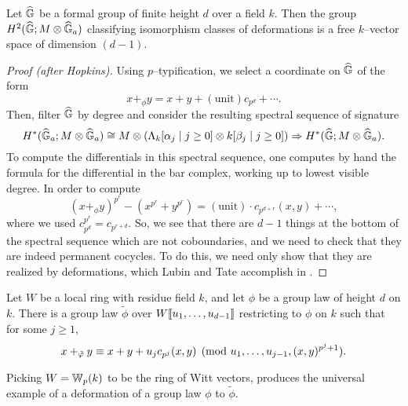 \begin{lemma}\label{CalculationOfLTTangentSpace}
Let $\widehat{\mathbb G}$ be a formal group of finite height $d$ over a field $k$.  Then the group $H^2(\widehat{\mathbb G}; M \otimes \widehat{\mathbb G}_a)$ classifying isomorphism classes of deformations is a free $k$--vector space of dimension $(d - 1)$.
\end{lemma}
\begin{proof}[Proof (after Hopkins)]
Using $p$--typification, we select a coordinate on $\widehat{\mathbb G}$ of the form \[x +_\phi y = x + y + (\mathrm{unit}) c_{p^d} + \cdots.\]  Then, filter $\widehat{\mathbb G}$ by degree and consider the resulting spectral sequence of signature \[H^*(\widehat{\mathbb G}_a; M \otimes \widehat{\mathbb G}_a) \cong M \otimes (\Lambda_k[\alpha_j \mid j \ge 0] \otimes k[\beta_j \mid j \ge 0]) \Rightarrow H^*(\widehat{\mathbb G}; M \otimes \widehat{\mathbb G}_a).\]  To compute the differentials in this spectral sequence, one computes by hand the formula for the differential in the bar complex, working up to lowest visible degree.  In order to compute  \[(x +_\phi y)^{p^r} - (x^{p^r} + y^{p^r}) = (\text{unit}) \cdot c_{p^{d + r}}(x, y) + \cdots,\] where we used $c_{p^d}^{p^r} = c_{p^{r+d}}$.   So, we see that there are $d - 1$ things at the bottom of the spectral sequence which are not coboundaries, and we need to check that they are indeed permanent cocycles.  To do this, we need only show that they are realized by deformations, which Lubin and Tate accomplish in .
\end{proof}
\begin{lemma}\label{LubinTateRealizationLemma}
Let $W$ be a local ring with residue field $k$, and let $\phi$ be a group law of height $d$ on $k$.  There is a group law $\tilde\phi$ over $W\llbracket{u_1, \ldots, u_{d-1}}\rrbracket$ restricting to $\phi$ on $k$ such that for some $j \geq 1$, \[x +_{\tilde \phi} y \equiv x + y + u_j c_{p^j}(x, y) \pmod{u_1, \ldots, u_{j-1}, (x, y)^{p^j+1}}. \qed\]
\end{lemma}

Picking $W = \mathbb W_p(k)$ to be the ring of Witt vectors,  produces the universal example of a deformation of a group law $\phi$ to $\tilde \phi$.

